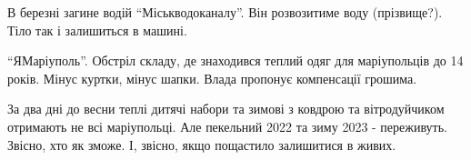 В березні загине водій \enquote{Міськводоканалу}. Він розвозитиме воду (прізвище?).
Тіло так і залишиться в машині. 

\enquote{ЯМаріуполь}. Обстріл складу, де знаходився теплий одяг для маріупольців до 14
років. Мінус куртки, мінус шапки. Влада пропонує компенсації грошима. 

За два дні до весни теплі дитячі набори та зимові з ковдрою та вітродуйчиком
отримають не всі маріупольці. Але пекельний 2022 та зиму 2023 - переживуть.
Звісно, хто як зможе. І, звісно, якщо пощастило залишитися в живих.

